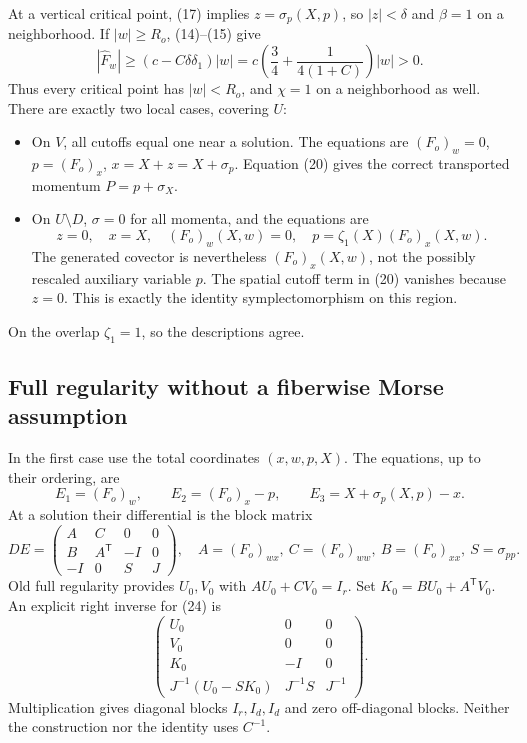 \documentclass[11pt]{article}
\begin{document}
At a vertical critical point, (17) implies
\(z=\sigma_p(X,p)\), so \(|z|<\delta\) and \(\beta=1\)
on a neighborhood. If \(|w|\geq R_o\), (14)--(15) give
\[
 |\widehat F_w|
 \geq(c-C\delta\delta_1)|w|
 =c\left(\frac34+\frac1{4(1+C)}\right)|w|>0.
 \tag{21}
\]
Thus every critical point has \(|w|<R_o\), and \(\chi=1\)
on a neighborhood as well. There are exactly two local cases,
covering \(U\):
\begin{itemize}
\item On \(V\), all cutoffs equal one near a solution. The
equations are
\((F_o)_w=0\), \(p=(F_o)_x\), \(x=X+z=X+\sigma_p\).
Equation (20) gives the correct transported momentum
\(P=p+\sigma_X\).
\item On \(U\setminus D\), \(\sigma=0\) for all momenta, and the
equations are
\[
 z=0,\quad x=X,\quad (F_o)_w(X,w)=0,\quad
 p=\zeta_1(X)(F_o)_x(X,w).
 \tag{22}
\]
The generated covector is nevertheless \((F_o)_x(X,w)\), not
the possibly rescaled auxiliary variable \(p\). The spatial
cutoff term in (20) vanishes because \(z=0\).
This is exactly the identity symplectomorphism on this region.
\end{itemize}
On the overlap \(\zeta_1=1\), so the descriptions agree.

\subsection{Full regularity without a fiberwise Morse assumption}

In the first case use the total coordinates \((x,w,p,X)\).
The equations, up to their ordering, are
\[
 E_1=(F_o)_w,\qquad E_2=(F_o)_x-p,\qquad
 E_3=X+\sigma_p(X,p)-x.
 \tag{23}
\]
At a solution their differential is the block matrix
\[
 D E=
 \begin{pmatrix}
 A&C&0&0\\ B&A^{\mathsf T}&-I&0\\-I&0&S&J
 \end{pmatrix},
 \quad
 A=(F_o)_{wx},\ C=(F_o)_{ww},\
 B=(F_o)_{xx},\ S=\sigma_{pp}.
 \tag{24}
\]
Old full regularity provides \(U_0,V_0\) with
\(AU_0+CV_0=I_r\). Set \(K_0=BU_0+A^{\mathsf T}V_0\).
An explicit right inverse for (24) is
\[
 \begin{pmatrix}
 U_0&0&0\\ V_0&0&0\\ K_0&-I&0\\
 J^{-1}(U_0-SK_0)&J^{-1}S&J^{-1}
 \end{pmatrix}.
 \tag{25}
\]
Multiplication gives diagonal blocks \(I_r,I_d,I_d\) and zero
off-diagonal blocks. Neither the construction nor the identity
uses \(C^{-1}\).
\end{document}
